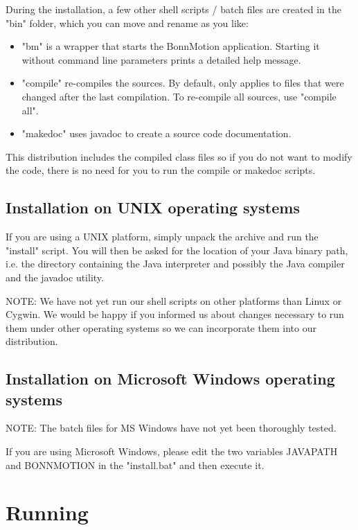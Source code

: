 \documentclass[11pt,a4paper,twoside,normalheadings,headsepline,DIV13,BCOR11mm,openright]{article}
\begin{document}
During  the  installation,  a  few other shell scripts / batch files are
created in the "bin" folder, which you can move and rename as you like:

\begin{itemize}
\item{"bm" is a wrapper that starts the BonnMotion application. Starting it
   without command line parameters prints a detailed help message.}

\item{"compile"  re-compiles the sources. By default, only applies to files
   that were changed after  the  last  compilation.  To  re-compile  all
   sources, use "compile all".}

\item{"makedoc" uses javadoc to create a source code documentation.}
\end{itemize}

This  distribution  includes  the  compiled class files so if you do not
want to modify the code, there is no need for you to run the compile  or
makedoc scripts.


\subsection{Installation on UNIX operating systems}

If  you are using a UNIX platform, simply unpack the archive and run the
"install" script. You will then be asked for the location of  your  Java
binary  path,  i.e.  the  directory  containing the Java interpreter and
possibly the Java compiler and the javadoc utility.

NOTE: We have not yet run our shell  scripts  on  other  platforms  than
Linux  or  Cygwin.  We  would  be happy if you informed us about changes
necessary  to  run  them  under  other  operating  systems  so  we   can
incorporate them into our distribution.


\subsection{Installation on Microsoft Windows operating systems}

NOTE:  The  batch  files  for  MS  Windows  have not yet been thoroughly
tested.

If you are using  Microsoft  Windows,  please  edit  the  two  variables
JAVAPATH and BONNMOTION in the "install.bat" and then execute it.


\section{Running}
\end{document}
